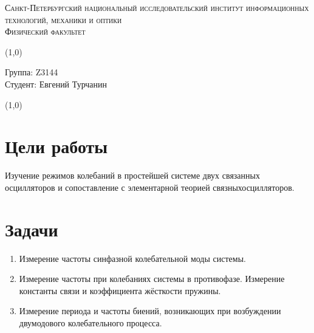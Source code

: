 \documentclass[a4paper]{article}
\begin{document}
\begin{center}
\textsc{Санкт-Петербургский национальный исследовательский институт информационных технологий, механики и оптики\\[3mm]
Физический факультет} \\[3mm]

\end{center}
\vspace{5mm}

\vspace{2mm}
\line(1,0){\textwidth}
\vspace{5mm}
\begin{minipage}{0.4\textwidth}
    Группа: Z3144 \\
    Студент: Евгений Турчанин\\
    \vspace{1mm}
\end{minipage}
\hfill
\vspace{1mm}
\line(1,0){\textwidth}


\section{ \textbf{Цели работы}}

Изучение режимов колебаний в простейшей системе двух связанных осцилляторов и сопоставление с элементарной теорией связныхосцилляторов.

\section{\textbf{Задачи}}

\begin{enumerate}
    \item  Измерение частоты синфазной колебательной моды системы.
    \item  Измерение частоты при колебаниях системы в противофазе.
Измерение константы связи и коэффициента жёсткости пружины.
    \item  Измерение периода и частоты биений, возникающих при возбуждении двумодового колебательного процесса.
\end{enumerate}
\end{document}
